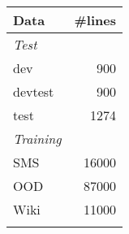 



\begin{tabular}{  lr  } \toprule

Data & \#lines  \\ 
\toprule
\emph{Test} \\
\cmidrule(r){1-2} 


dev & 900 \\
devtest & 900 \\
test & 1274 \\
\toprule
\emph{Training} \\
\cmidrule(r){1-2} 

SMS & 16000 \\
OOD & 87000 \\
Wiki & 11000 \\ 



\bottomrule
\small
\label{table:datasets}
\end{tabular}

